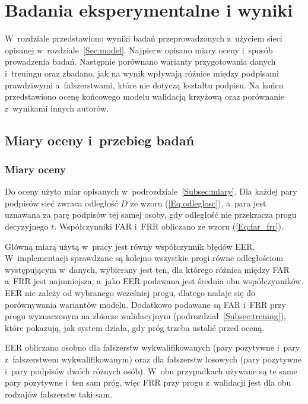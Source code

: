 \documentclass[12pt, twoside, openright]{article}
\begin{document}
\section{Badania eksperymentalne i wyniki}
\label{Sec:wyniki}

W~rozdziale przedstawiono wyniki badań przeprowadzonych z~użyciem sieci opisanej w~rozdziale~\ref{Sec:model}.
Najpierw opisano miary oceny i~sposób prowadzenia badań.
Następnie porównano warianty przygotowania danych i~treningu oraz zbadano, jak na wynik wpływają różnice między podpisami prawdziwymi a~fałszerstwami, które nie dotyczą kształtu podpisu.
Na końcu przedstawiono ocenę końcowego modelu walidacją krzyżową oraz porównanie z~wynikami innych autorów.

\subsection{Miary oceny i~przebieg badań}
\label{Subsec:metodyka}

\subsubsection*{Miary oceny}

Do oceny użyto miar opisanych w~podrozdziale~\ref{Subsec:miary}.
Dla każdej pary podpisów sieć zwraca odległość $D$ ze wzoru (\ref{Eq:odleglosc}), a~para jest uznawana za parę podpisów tej samej osoby, gdy odległość nie przekracza progu decyzyjnego $t$.
Współczynniki FAR i~FRR obliczano ze wzoru (\ref{Eq:far_frr}).

Główną miarą użytą w~pracy jest równy współczynnik błędów EER.
W~implementacji sprawdzane są kolejno wszystkie progi równe odległościom występującym w~danych, wybierany jest ten, dla którego różnica między FAR a~FRR jest najmniejsza, a~jako EER podawana jest średnia obu współczynników.
EER nie zależy od wybranego wcześniej progu, dlatego nadaje się do porównywania wariantów modelu.
Dodatkowo podawane są FAR i~FRR przy progu wyznaczonym na zbiorze walidacyjnym (podrozdział~\ref{Subsec:trening}), które pokazują, jak system działa, gdy próg trzeba ustalić przed oceną.

EER obliczano osobno dla fałszerstw wykwalifikowanych (pary pozytywne i~pary z~fałszerstwem wykwalifikowanym) oraz dla fałszerstw losowych (pary pozytywne i~pary podpisów dwóch różnych osób).
W~obu przypadkach używane są te same pary pozytywne i~ten sam próg, więc FRR przy progu z~walidacji jest dla obu rodzajów fałszerstw taki sam.
\end{document}
